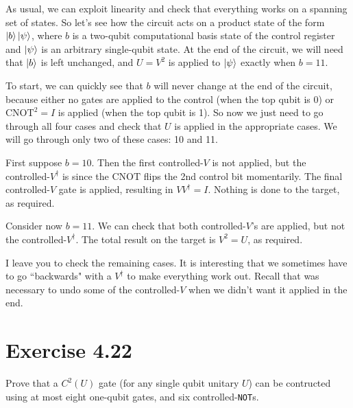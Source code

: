 \documentclass{book}
\begin{document}
    As usual, we can exploit linearity and check that everything works on a spanning set of states. So let's see how the circuit acts on a product state of the form $\ket{b}\ket{\psi}$, where $b$ is a two-qubit computational basis state of the control register and $\ket{\psi}$ is an arbitrary single-qubit state. At the end of the circuit, we will need that $\ket{b}$ is left unchanged, and $U = V^2$ is applied to $\ket{\psi}$ exactly when $b = 11$.

    To start, we can quickly see that $b$ will never change at the end of the circuit, because either no gates are applied to the control (when the top qubit is 0) or $\mathrm{CNOT}^2 = I$ is applied (when the top qubit is 1). So now we just need to go through all four cases and check that $U$ is applied in the appropriate cases. We will go through only two of these cases: 10 and 11.

    First suppose $b = 10$. Then the first controlled-$V$ is not applied, but the controlled-$V^\dagger$ is  since the $\mathrm{CNOT}$ flips the 2nd control bit momentarily. The final controlled-$V$ gate is applied, resulting in $V V^\dagger = I$. Nothing is done to the target, as required.

    Consider now $b = 11$. We can check that both controlled-$V$'s are applied, but not the controlled-$V^\dagger$. The total result on the target is $V^2 = U$, as required. 

    I leave you to check the remaining cases. It is interesting that we sometimes have to go ``backwards" with a $V^\dagger$ to make everything work out. Recall that was necessary to undo some of the controlled-$V$ when we didn't want it applied in the end.

\section*{Exercise 4.22}
    Prove that a $C^2(U)$ gate (for any single qubit unitary $U$) can be contructed using at most eight one-qubit gates, and six controlled-\texttt{NOT}s.
\end{document}

